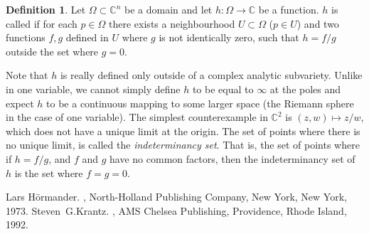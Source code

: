 \documentclass[12pt]{article}
\theoremstyle{theorem}
\theoremstyle{definition}
\newtheorem*{defn}{Definition}
\theoremstyle{remark}
\begin{document}
\begin{defn}
Let $\Omega \subset {\mathbb{C}}^n$ be a domain and let $h \colon \Omega \to
{\mathbb{C}}$ be a function. $h$ is called {\em {}} if for each $p \in \Omega$ there exists a neighbourhood $U \subset \Omega$ ($p \in U$) and two 
functions $f, g$ defined in $U$ where $g$ is not identically zero, such that
$h = f/g$ outside the set where $g = 0$.
\end{defn}

Note that $h$ is really defined only outside of a complex analytic subvariety.  Unlike in one variable, we cannot simply define $h$ to be equal to $\infty$ at the poles and expect $h$ to be a continuous mapping to some larger space (the Riemann sphere in the case of one variable).  The simplest counterexample in ${\mathbb{C}}^2$ is $(z,w) \mapsto z/w$, which does not have a unique limit at the origin.  The set of points where there is no unique limit, is called the {\em indeterminancy set}.  That is, the set of points where if $h = f/g$, and $f$ and $g$ have no common factors, then the indeterminancy set of $h$ is the set where $f = g = 0$.

\begin{thebibliography}{9}
Lars H\"ormander.
{\em {}},
North-Holland Publishing Company, New York, New York, 1973.
Steven~G.\@ Krantz.
{\em {}},
AMS Chelsea Publishing, Providence, Rhode Island, 1992.
\end{thebibliography}

\end{document}
